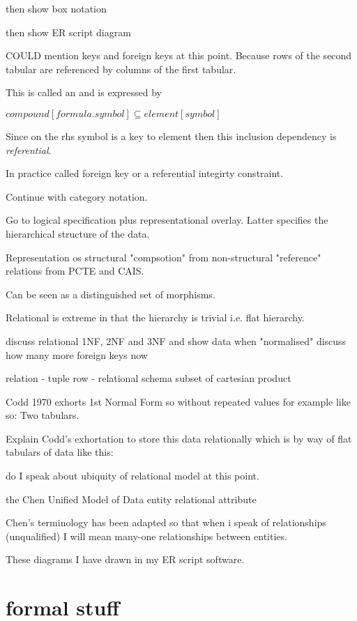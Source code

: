 \documentclass[10pt,a4paper]{article}
\theoremstyle{remark}
\begin{document}
then show box notation 

then show ER script diagram



COULD mention keys and foreign keys at this point. Because rows of the second tabular are referenced by columns of the first tabular.

This is called an 
  and is expressed by 

$compound[formula.symbol] \subseteq element[symbol]$

Since on the rhs symbol is a key to element then this inclusion dependency is \textit{referential}.

In practice called foreign key or a referential integirty constraint.

Continue with category notation.

Go to logical specification plus representational overlay.
Latter specifies the hierarchical structure of the data.

Representation os structural "compsotion" from non-structural "reference" relations from PCTE and CAIS.

Can be seen as a distinguished set of morphisms.

Relational is extreme in that the hierarchy is trivial i.e. flat hierarchy.

discuss relational 1NF, 2NF and 3NF and
show data when "normalised"
 discuss how many more foreign keys now

relation - tuple row - relational schema subset of cartesian product

Codd 1970 exhorts 1st Normal Form so without repeated values for example like so:
Two tabulars.

Explain Codd's exhortation to store this data relationally which is by way of flat tabulars of data like this:


do I speak about ubiquity of relational model at this point.

the Chen Unified Model of Data entity relational attribute

Chen's terminology has been adapted so that when i speak of relationships (unqualified) I will mean many-one relationships between entities.

These diagrams I have drawn in my ER script software.

\section{formal stuff}
\end{document}
